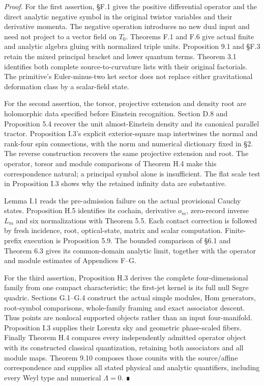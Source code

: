 \documentclass[
  english,
  11pt,
  reqno]{amsart}
\begin{document}
\emph{Proof.} For the first assertion, §F.1 gives the positive
differential operator and the direct analytic negative symbol in the
original twistor variables and their derivative momenta. The negative
operation introduces no new dual input and need not project to a vector
field on \(T_0\). Theorems F.1 and F.6 give actual finite and analytic
algebra gluing with normalized triple units. Proposition 9.1 and §F.3
retain the mixed principal bracket and lower quantum terms. Theorem 3.1
identifies both complete source-to-curvature lists with their original
factorials. The primitive's Euler-minus-two ket sector does not replace
either gravitational deformation class by a scalar-field state.

For the second assertion, the torsor, projective extension and density
root are holomorphic data specified before Einstein recognition. Section
D.8 and Proposition 5.4 recover the unit almost-Einstein density and its
canonical parallel tractor. Proposition I.3's explicit exterior-square
map intertwines the normal and rank-four spin connections, with the norm
and numerical dictionary fixed in §2. The reverse construction recovers
the same projective extension and root. The operator, torsor and module
comparisons of Theorem H.4 make this correspondence natural; a principal
symbol alone is insufficient. The flat scale test in Proposition I.3
shows why the retained infinity data are substantive.

Lemma I.1 reads the pre-admission failure on the actual provisional
Cauchy states. Proposition H.5 identifies its cochain, derivative
\(o_m\), zero-record inverse \(L_m\) and six normalizations with Theorem
5.5. Each contact correction is followed by fresh incidence, root,
optical-state, matrix and scalar computation. Finite-prefix execution is
Proposition 5.9. The bounded comparison of §6.1 and Theorem 6.3 gives
its common-domain analytic limit, together with the operator and module
estimates of Appendices F--G.

For the third assertion, Proposition H.3 derives the complete
four-dimensional family from one compact characteristic; the first-jet
kernel is its full null Segre quadric. Sections G.1--G.4 construct the
actual simple modules, Hom generators, root-symbol comparisons,
whole-family framing and exact associator descent. Thus points are
nonlocal supported objects rather than an input four-manifold.
Proposition I.3 supplies their Lorentz sky and geometric phase-scaled
fibers. Finally Theorem H.4 compares every independently admitted
operator object with its constructed classical quantization, retaining
both associators and all module maps. Theorem 9.10 composes those
counits with the source/affine correspondence and supplies all stated
physical and analytic quantifiers, including every Weyl type and
numerical \(\Lambda=0\). ∎
\end{document}
